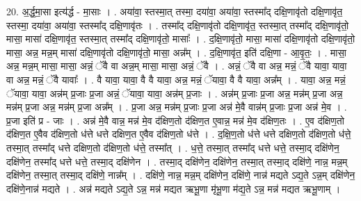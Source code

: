 \documentclass[17pt]{extarticle}
\begin{document}
20. अ॒र्द्ध॒मा॒सा इत्य॑र्द्ध - मा॒साः । . अया॑वा॒ स्तस्मा॒त् तस्मा॒ दया॑वा॒ अया॑वा॒ स्तस्मा᳚द् दक्षि॒णावृ॑तो दक्षि॒णावृ॑त॒ स्तस्मा॒ दया॑वा॒ अया॑वा॒ स्तस्मा᳚द् दक्षि॒णावृ॑तः । . तस्मा᳚द् दक्षि॒णावृ॑तो दक्षि॒णावृ॑त॒ स्तस्मा॒त् तस्मा᳚द् दक्षि॒णावृ॑तो॒ मासा॒ मासा॑ दक्षि॒णावृ॑त॒ स्तस्मा॒त् तस्मा᳚द् दक्षि॒णावृ॑तो॒ मासाः᳚ । . द॒क्षि॒णावृ॑तो॒ मासा॒ मासा॑ दक्षि॒णावृ॑तो दक्षि॒णावृ॑तो॒ मासा॒ अन्न॒ मन्न॒म् मासा॑ दक्षि॒णावृ॑तो दक्षि॒णावृ॑तो॒ मासा॒ अन्न᳚म् । . द॒क्षि॒णावृ॑त॒ इति॑ दक्षि॒णा - आ॒वृ॒तः॒ । . मासा॒ अन्न॒ मन्न॒म् मासा॒ मासा॒ अन्नं॒ ॅवै वा अन्न॒म् मासा॒ मासा॒ अन्नं॒ ॅवै । . अन्नं॒ ॅवै वा अन्न॒ मन्नं॒ ॅवै यावा॒ यावा॒ वा अन्न॒ मन्नं॒ ॅवै यावाः᳚ । . वै यावा॒ यावा॒ वै वै यावा॒ अन्न॒ मन्नं॒ ॅयावा॒ वै वै यावा॒ अन्न᳚म् । . यावा॒ अन्न॒ मन्नं॒ ॅयावा॒ यावा॒ अन्न॑म् प्र॒जाः प्र॒जा अन्नं॒ ॅयावा॒ यावा॒ अन्न॑म् प्र॒जाः । . अन्न॑म् प्र॒जाः प्र॒जा अन्न॒ मन्न॑म् प्र॒जा अन्न॒ मन्न॑म् प्र॒जा अन्न॒ मन्न॑म् प्र॒जा अन्न᳚म् । . प्र॒जा अन्न॒ मन्न॑म् प्र॒जाः प्र॒जा अन्न॑ मे॒वै वान्न॑म् प्र॒जाः प्र॒जा अन्न॑ मे॒व । . प्र॒जा इति॑ प्र - जाः । . अन्न॑ मे॒वै वान्न॒ मन्न॑ मे॒व द॑क्षिण॒तो द॑क्षिण॒त ए॒वान्न॒ मन्न॑ मे॒व द॑क्षिण॒तः । . ए॒व द॑क्षिण॒तो द॑क्षिण॒त ए॒वैव द॑क्षिण॒तो ध॑त्ते धत्ते दक्षिण॒त ए॒वैव द॑क्षिण॒तो ध॑त्ते । . द॒क्षि॒ण॒तो ध॑त्ते धत्ते दक्षिण॒तो द॑क्षिण॒तो ध॑त्ते॒ तस्मा॒त् तस्मा᳚द् धत्ते दक्षिण॒तो द॑क्षिण॒तो ध॑त्ते॒ तस्मा᳚त् । . ध॒त्ते॒ तस्मा॒त् तस्मा᳚द् धत्ते धत्ते॒ तस्मा॒द् दक्षि॑णेन॒ दक्षि॑णेन॒ तस्मा᳚द् धत्ते धत्ते॒ तस्मा॒द् दक्षि॑णेन । . तस्मा॒द् दक्षि॑णेन॒ दक्षि॑णेन॒ तस्मा॒त् तस्मा॒द् दक्षि॑णे॒ नान्न॒ मन्न॒म् दक्षि॑णेन॒ तस्मा॒त् तस्मा॒द् दक्षि॑णे॒ नान्न᳚म् । . दक्षि॑णे॒ नान्न॒ मन्न॒म् दक्षि॑णेन॒ दक्षि॑णे॒ नान्न॑ मद्यते ऽद्य॒ते ऽन्न॒म् दक्षि॑णेन॒ दक्षि॑णे॒नान्न॑ मद्यते । . अन्न॑ मद्यते ऽद्य॒ते ऽन्न॒ मन्न॑ मद्यत ऋभू॒णा मृ॑भू॒णा म॑द्य॒ते ऽन्न॒ मन्न॑ मद्यत ऋभू॒णाम् । \newline
\end{document}
